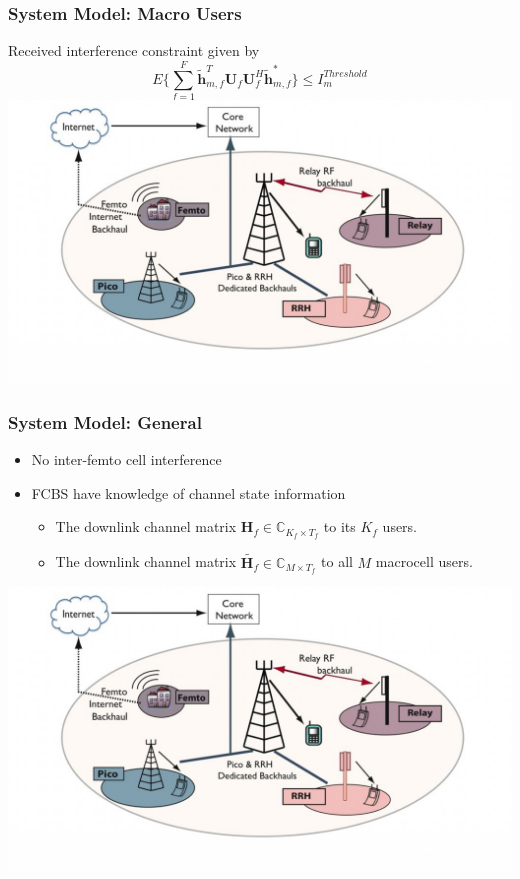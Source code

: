 \documentclass[10pt,tgadventor, onlymath]{beamer}
\begin{document}
\begin{frame}
\frametitle{System Model: Macro Users}
	Received interference constraint given by 
	\begin{equation}
	E\{\sum^F_{f=1} \mathbf{\tilde{h}}_{m,f}^T  \mathbf{U}_{f}					
	\mathbf{U}_{f}^{H} \mathbf{\tilde{h}}_{m,f}^*\} \leq I^{Threshold}		
	_{m}
	\end{equation}
	\bigskip
	\centering
		\includegraphics[scale=.2]{het_net}
\end{frame}

\begin{frame}
\frametitle{System Model: General}
\begin{itemize}
\setlength\itemsep{2em}

\item 
	No inter-femto cell interference
\item 
	FCBS have knowledge of channel state information 
	\begin{itemize}
	\item 
	The downlink channel matrix $\mathbf{H}_f \in \mathbb{C}_{K_{f} \times T_{f}} $ to its $K_{f} $ users.
	\item The downlink channel matrix $\tilde{\mathbf{H}_{f}} \in \mathbb{C}_{M \times T_{f}}$ 
	to all $M$ macrocell users.
	\end{itemize}
\end{itemize}
	\bigskip
	\centering
		\includegraphics[scale=.2]{het_net}
\end{frame}
\end{document}
